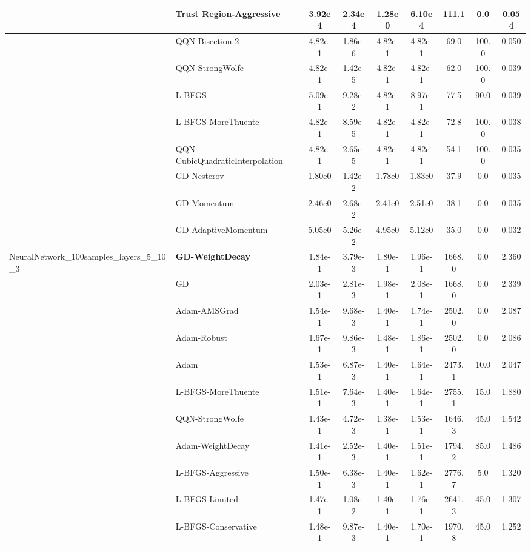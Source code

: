 \documentclass{article}
\begin{document}
\begin{longtable}{|l|l|c|c|c|c|c|c|c|}
\hline
 & Trust Region-Aggressive & 3.92e4 & 2.34e4 & 1.28e0 & 6.10e4 & 111.1 & 0.0 & 0.054 \\
\hline
 & QQN-Bisection-2 & 4.82e-1 & 1.86e-6 & 4.82e-1 & 4.82e-1 & 69.0 & 100.0 & 0.050 \\
\hline
 & QQN-StrongWolfe & 4.82e-1 & 1.42e-5 & 4.82e-1 & 4.82e-1 & 62.0 & 100.0 & 0.039 \\
\hline
 & L-BFGS & 5.09e-1 & 9.28e-2 & 4.82e-1 & 8.97e-1 & 77.5 & 90.0 & 0.039 \\
\hline
 & L-BFGS-MoreThuente & 4.82e-1 & 8.59e-5 & 4.82e-1 & 4.82e-1 & 72.8 & 100.0 & 0.038 \\
\hline
 & QQN-CubicQuadraticInterpolation & 4.82e-1 & 2.65e-5 & 4.82e-1 & 4.82e-1 & 54.1 & 100.0 & 0.035 \\
\hline
 & GD-Nesterov & 1.80e0 & 1.42e-2 & 1.78e0 & 1.83e0 & 37.9 & 0.0 & 0.035 \\
\hline
 & GD-Momentum & 2.46e0 & 2.68e-2 & 2.41e0 & 2.51e0 & 38.1 & 0.0 & 0.035 \\
\hline
 & GD-AdaptiveMomentum & 5.05e0 & 5.26e-2 & 4.95e0 & 5.12e0 & 35.0 & 0.0 & 0.032 \\
NeuralNetwork\_100samples\_layers\_5\_10\_3 & \textbf{GD-WeightDecay} & 1.84e-1 & 3.79e-3 & 1.80e-1 & 1.96e-1 & 1668.0 & 0.0 & 2.360 \\
\hline
 & GD & 2.03e-1 & 2.81e-3 & 1.98e-1 & 2.08e-1 & 1668.0 & 0.0 & 2.339 \\
\hline
 & Adam-AMSGrad & 1.54e-1 & 9.68e-3 & 1.40e-1 & 1.74e-1 & 2502.0 & 0.0 & 2.087 \\
\hline
 & Adam-Robust & 1.67e-1 & 9.86e-3 & 1.48e-1 & 1.86e-1 & 2502.0 & 0.0 & 2.086 \\
\hline
 & Adam & 1.53e-1 & 6.87e-3 & 1.40e-1 & 1.64e-1 & 2473.1 & 10.0 & 2.047 \\
\hline
 & L-BFGS-MoreThuente & 1.51e-1 & 7.64e-3 & 1.40e-1 & 1.64e-1 & 2755.1 & 15.0 & 1.880 \\
\hline
 & QQN-StrongWolfe & 1.43e-1 & 4.72e-3 & 1.38e-1 & 1.53e-1 & 1646.3 & 45.0 & 1.542 \\
\hline
 & Adam-WeightDecay & 1.41e-1 & 2.52e-3 & 1.40e-1 & 1.51e-1 & 1794.2 & 85.0 & 1.486 \\
\hline
 & L-BFGS-Aggressive & 1.50e-1 & 6.38e-3 & 1.40e-1 & 1.62e-1 & 2776.7 & 5.0 & 1.320 \\
\hline
 & L-BFGS-Limited & 1.47e-1 & 1.08e-2 & 1.40e-1 & 1.76e-1 & 2641.3 & 45.0 & 1.307 \\
\hline
 & L-BFGS-Conservative & 1.48e-1 & 9.87e-3 & 1.40e-1 & 1.70e-1 & 1970.8 & 45.0 & 1.252 \\

\end{longtable}
\end{document}
